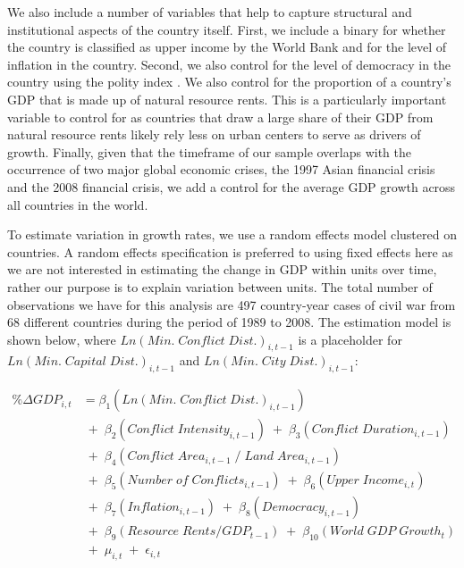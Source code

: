 We also include a number of variables that help to capture structural and institutional aspects of the country itself. First, we include a binary for whether the country is classified as upper income by the World Bank and for the level of inflation in the country. Second, we also control for the level of democracy in the country using the polity index \citep{marshall:etal:2013}. We also control for the proportion of a country's GDP that is made up of natural resource rents. This is a particularly important variable to control for as countries that draw a large share of their GDP from natural resource rents likely rely less on urban centers to serve as drivers of growth. Finally, given that the timeframe of our sample overlaps with the occurrence of two major global economic crises, the 1997 Asian financial crisis and the 2008 financial crisis, we add a control for the average GDP growth across all countries in the world. 


To estimate variation in growth rates, we use a random effects model clustered on countries. A random effects specification is preferred to using fixed effects here as we are not interested in estimating the change in GDP within units over time, rather our purpose is to explain variation between units. The total number of observations we have for this analysis are 497 country-year cases of civil war from 68 different countries during the period of 1989 to 2008. The estimation model is shown below, where $Ln(Min. \; Conflict \; Dist.)_{i,t-1}$ is a placeholder for $Ln(Min. \; Capital \; Dist.)_{i,t-1}$ and $Ln(Min. \; City \; Dist.)_{i,t-1}$:

\begin{align*}
	\% \Delta GDP_{i,t} &= \beta_{1}(Ln(Min. \; Conflict \; Dist.)_{i,t-1}) \\
	& \;+\; \beta_{2}(Conflict \; Intensity_{i,t-1}) \;+\; \beta_{3}(Conflict \; Duration_{i,t-1}) \\
	& \;+\; \beta_{4}(Conflict \; Area_{i,t-1} \;/\; Land \; Area_{i,t-1}) \\
	& \;+\; \beta_{5}(Number \; of \; Conflicts_{i,t-1}) \;+\; \beta_{6}(Upper \; Income_{i,t}) \\	
	& \;+\; \beta_{7}(Inflation_{i,t-1}) \;+\; \beta_{8}(Democracy_{i,t-1}) \\
	& \;+\; \beta_{9}(Resource \; Rents/GDP_{t-1}) \;+\; \beta_{10}(World \; GDP \; Growth_{t}) \\
	& \;+\; \mu_{i,t} \;+\; \epsilon_{i,t}
\end{align*}

